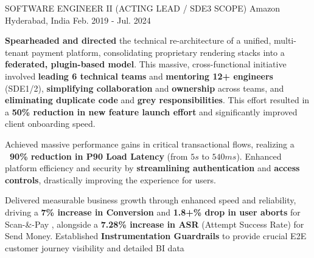 \begin{cventries}
    \cventry
    {SOFTWARE ENGINEER II (ACTING LEAD / SDE3 SCOPE)} %
    {Amazon} %
    {Hyderabad, India} %
    {Feb. 2019 - Jul. 2024} %
    { 
		\begin{cvitems} %
    	    \item {\textbf{Spearheaded and directed} the technical re-architecture of a unified, multi-tenant payment platform, consolidating proprietary rendering stacks into a \textbf{federated, plugin-based model}. This massive, cross-functional initiative involved \textbf{leading 6 technical teams} and \textbf{mentoring 12+ engineers} (SDE1/2), \textbf{simplifying collaboration} and \textbf{ownership} across teams, and \textbf{eliminating duplicate code} and \textbf{grey responsibilities}. This effort resulted in a \textbf{50\% reduction in new feature launch effort} and significantly improved client onboarding speed.}
			\item {Achieved massive performance gains in critical transactional flows, realizing a \textbf{~90\% reduction in P90 Load Latency} (from $5s$ to $540ms$). Enhanced platform efficiency and security by \textbf{streamlining authentication} and \textbf{access controls}, drastically improving the experience for users.} %
			\item {Delivered measurable business growth through enhanced speed and reliability, driving a \textbf{7\% increase in Conversion} and \textbf{1.8+\% drop in user aborts} for Scan-\&-Pay , alongside a \textbf{7.28\% increase in ASR} (Attempt Success Rate) for Send Money. Established \textbf{Instrumentation Guardrails} to provide crucial E2E customer journey visibility and detailed BI data} %

\end{cvitems}}
\end{cventries}

